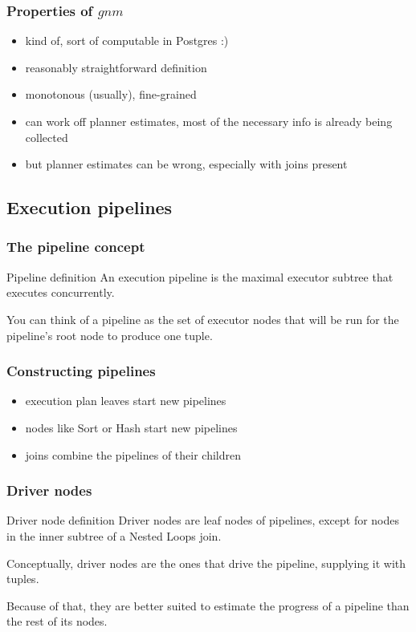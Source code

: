 \documentclass{beamer}
\begin{document}
\begin{frame}
  \frametitle{Properties of $gnm$}

  \begin{itemize}
  \item kind of, sort of computable in Postgres :)
  \item reasonably straightforward definition
  \item monotonous (usually), fine-grained
  \item can work off planner estimates, most of the necessary info is already
    being collected
  \item but planner estimates can be wrong, especially with joins present
  \end{itemize}
\end{frame}

\subsection{Execution pipelines}

\begin{frame}
  \frametitle{The pipeline concept}

  \begin{block}{Pipeline definition}
    An execution pipeline is the maximal executor subtree that executes
    concurrently.
  \end{block}

  \bigskip

  You can think of a pipeline as the set of executor nodes that will be run
  for the pipeline's root node to produce one tuple.
\end{frame}

\begin{frame}
  \frametitle{Constructing pipelines}

  \begin{itemize}
  \item execution plan leaves start new pipelines
  \item nodes like Sort or Hash start new pipelines
  \item joins combine the pipelines of their children
  \end{itemize}
\end{frame}

\begin{frame}
  \frametitle{Driver nodes}

  \begin{block}{Driver node definition}
    Driver nodes are leaf nodes of pipelines, except for nodes in the inner
    subtree of a Nested Loops join.
  \end{block}

  \bigskip

  Conceptually, driver nodes are the ones that \alert{drive} the pipeline,
  supplying it with tuples.

  \bigskip

  Because of that, they are better suited to estimate the progress of a
  pipeline than the rest of its nodes.
\end{frame}
\end{document}
